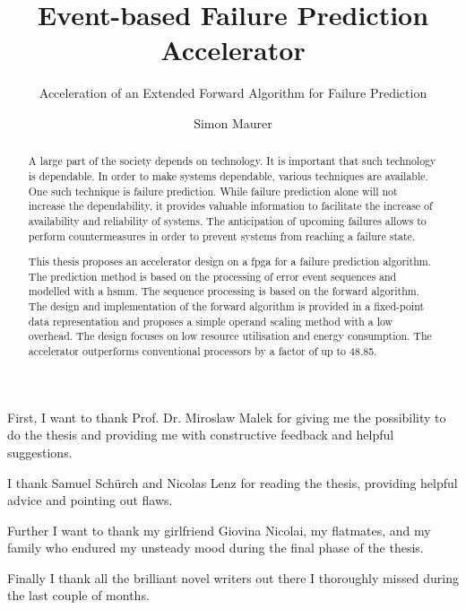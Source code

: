 \documentclass[mscthesis]{usiinfthesis}
\title{Event-based Failure Prediction Accelerator} %
\subtitle{Acceleration of an Extended Forward Algorithm for Failure Prediction}
\author{Simon Maurer} %
\begin{document}
\maketitle %

\frontmatter %

\begin{abstract}
    A large part of the society depends on technology. It is important
    that such technology is dependable. In order to make systems dependable,
    various techniques are available. One such technique is failure prediction.
    While failure prediction alone will not increase the dependability, it
    provides valuable information to facilitate the increase of availability
    and reliability of systems. The anticipation of upcoming failures allows to
    perform countermeasures in order to prevent systems from reaching a failure
    state.

    This thesis proposes an accelerator design on a \acrfull{fpga} for
    a failure prediction algorithm. The prediction method is based on the
    processing of error event sequences and modelled with a \acrfull{hsmm}. The
    sequence processing is based on the forward algorithm. The design and
    implementation of the forward algorithm is provided in a fixed-point data
    representation and proposes a simple operand scaling method with a low
    overhead. The design focuses on low resource utilisation and energy
    consumption. The accelerator outperforms conventional processors by
    a factor of up to 48.85.
\end{abstract}

%

\begin{acknowledgements}
First, I want to thank Prof. Dr. Miroslaw Malek for giving me the possibility
to do the thesis and providing me with constructive feedback and helpful
suggestions.

I thank Samuel Sch\"{u}rch and Nicolas Lenz for reading the thesis, providing
helpful advice and pointing out flaws.

Further I want to thank my girlfriend Giovina Nicolai, my flatmates, and my
family who endured my unsteady mood during the final phase of the thesis.

Finally I thank all the brilliant novel writers out there I thoroughly missed
during the last couple of months.

\end{acknowledgements}
\end{document}
